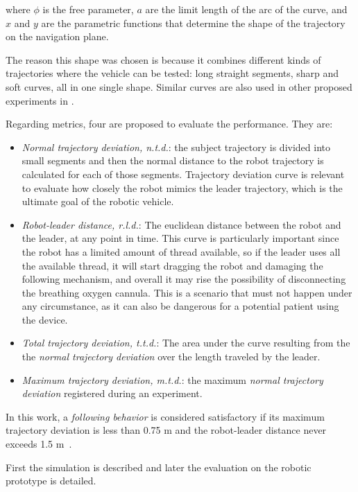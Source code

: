 \documentclass[journal]{IEEEtran}
\begin{document}
\noindent where $ \phi $ is the free parameter, $a$ are the limit length of the arc of the curve, and $x$ and $y$ are the parametric functions that determine the shape of the trajectory on the navigation plane.

The reason  this shape was chosen is because it combines different kinds of trajectories where the vehicle can be tested: long straight segments, sharp and soft curves, all in one single shape. Similar curves are also used in other proposed experiments in \cite{Neto2015,Endo2015}.  

Regarding metrics, four are proposed to evaluate the performance.  They are:

\begin{itemize}
    \item \textit{Normal trajectory deviation, n.t.d.}: the subject trajectory is divided into small segments and then the normal distance to the robot trajectory is calculated for each of those segments. Trajectory deviation curve is relevant to evaluate how closely the robot mimics the leader trajectory, which is the ultimate goal of the robotic vehicle. 
    \item \textit{Robot-leader distance, r.l.d.}: The euclidean distance between the robot and the leader, at any point in time. This curve is particularly important since the robot has a limited amount of thread available, so if the leader uses all the available thread, it will start dragging the robot and damaging the following mechanism, and overall it may rise the possibility of disconnecting the breathing oxygen cannula. This is a scenario that must not happen under any circumstance, as it can also be dangerous for a potential patient using the device. 
    \item \textit{Total trajectory deviation, t.t.d.}: The area under the curve resulting from the the \textit{normal trajectory deviation} over the length traveled by the leader.
    \item \textit{Maximum trajectory deviation, m.t.d.}: the maximum \textit{normal trajectory deviation} registered during an experiment.    
\end{itemize}{}

In this work, a \textit{following behavior} is considered satisfactory if its maximum trajectory deviation is less than 0.75 m and the robot-leader distance never exceeds 1.5 m~\cite{MunozCeballos2010}.

First the simulation is described and later the evaluation on the robotic prototype is detailed.
\end{document}
